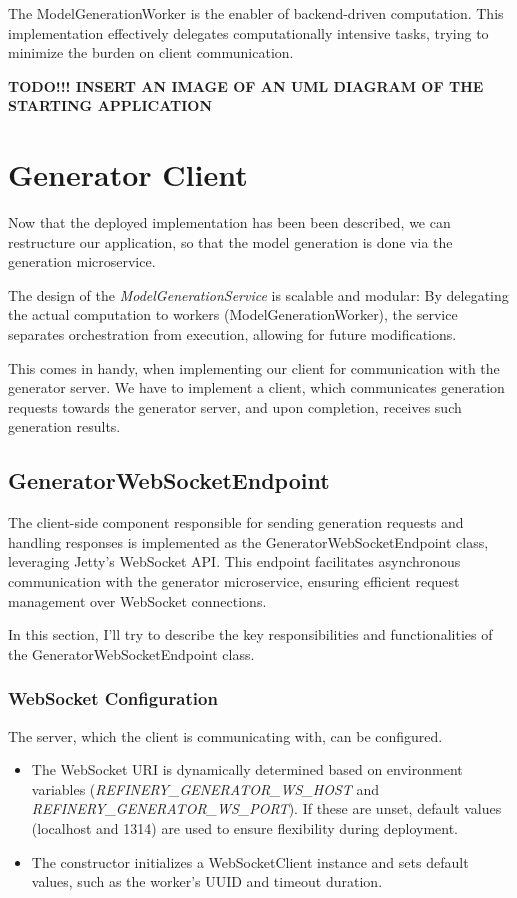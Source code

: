 			The ModelGenerationWorker is the enabler of backend-driven computation.
			This implementation effectively delegates computationally intensive tasks, trying to minimize 
			the burden on client communication.

		\textbf{TODO!!! INSERT AN IMAGE OF AN UML DIAGRAM OF THE STARTING APPLICATION}

	\section{Generator Client} \label{Generator Client}
			Now that the deployed implementation has been been described, we can restructure our application, so that the 
			model generation is done via the generation microservice.

			The design of the \textit{ModelGenerationService} is scalable and modular:
			By delegating the actual computation to workers (ModelGenerationWorker), the service separates orchestration from execution, 
			allowing for future modifications. 
			
			This comes in handy, when implementing our client for communication with
			the generator server. We have to implement a client, which communicates generation requests towards the generator server,
			and upon completion, receives such generation results.

			\subsection{GeneratorWebSocketEndpoint}
			The client-side component responsible for sending generation requests and handling responses is implemented as the GeneratorWebSocketEndpoint class,
			leveraging Jetty's WebSocket API. This endpoint facilitates asynchronous communication with the generator microservice, 
			ensuring efficient request management over WebSocket connections. 

			In this section, I'll try to describe the key responsibilities and functionalities of the GeneratorWebSocketEndpoint class.
			\subsubsection{WebSocket Configuration} 
				The server, which the client is communicating with, can be configured.
				\begin{itemize}
					\item The WebSocket URI is dynamically determined based on environment variables (\textit{REFINERY\_GENERATOR\_WS\_HOST} 
					and \textit{REFINERY\_GENERATOR\_WS\_PORT}). If these are unset, default values (localhost and 1314) are used to ensure flexibility during deployment.
					\item The constructor initializes a WebSocketClient instance and sets default values, such as the worker's UUID and timeout duration.
				\end{itemize} 
